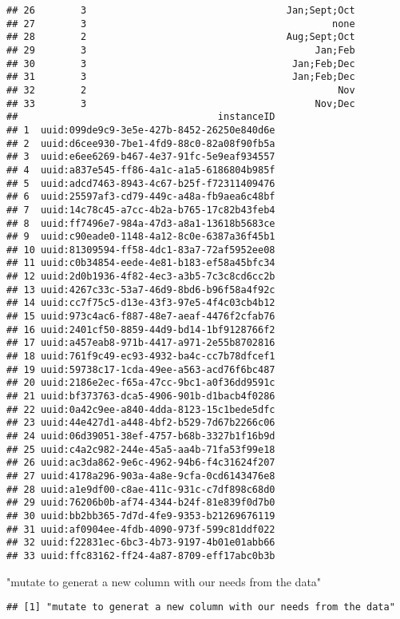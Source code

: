 \documentclass[
]{article}
\newenvironment{Shaded}{\begin{snugshade}}{\end{snugshade}}
\newcommand{\StringTok}[1]{\textcolor[rgb]{0.31,0.60,0.02}{#1}}
\begin{document}
\begin{verbatim}
## 26        3                                   Jan;Sept;Oct
## 27        3                                           none
## 28        2                                   Aug;Sept;Oct
## 29        3                                        Jan;Feb
## 30        3                                    Jan;Feb;Dec
## 31        3                                    Jan;Feb;Dec
## 32        2                                            Nov
## 33        3                                        Nov;Dec
##                                   instanceID
## 1  uuid:099de9c9-3e5e-427b-8452-26250e840d6e
## 2  uuid:d6cee930-7be1-4fd9-88c0-82a08f90fb5a
## 3  uuid:e6ee6269-b467-4e37-91fc-5e9eaf934557
## 4  uuid:a837e545-ff86-4a1c-a1a5-6186804b985f
## 5  uuid:adcd7463-8943-4c67-b25f-f72311409476
## 6  uuid:25597af3-cd79-449c-a48a-fb9aea6c48bf
## 7  uuid:14c78c45-a7cc-4b2a-b765-17c82b43feb4
## 8  uuid:ff7496e7-984a-47d3-a8a1-13618b5683ce
## 9  uuid:c90eade0-1148-4a12-8c0e-6387a36f45b1
## 10 uuid:81309594-ff58-4dc1-83a7-72af5952ee08
## 11 uuid:c0b34854-eede-4e81-b183-ef58a45bfc34
## 12 uuid:2d0b1936-4f82-4ec3-a3b5-7c3c8cd6cc2b
## 13 uuid:4267c33c-53a7-46d9-8bd6-b96f58a4f92c
## 14 uuid:cc7f75c5-d13e-43f3-97e5-4f4c03cb4b12
## 15 uuid:973c4ac6-f887-48e7-aeaf-4476f2cfab76
## 16 uuid:2401cf50-8859-44d9-bd14-1bf9128766f2
## 17 uuid:a457eab8-971b-4417-a971-2e55b8702816
## 18 uuid:761f9c49-ec93-4932-ba4c-cc7b78dfcef1
## 19 uuid:59738c17-1cda-49ee-a563-acd76f6bc487
## 20 uuid:2186e2ec-f65a-47cc-9bc1-a0f36dd9591c
## 21 uuid:bf373763-dca5-4906-901b-d1bacb4f0286
## 22 uuid:0a42c9ee-a840-4dda-8123-15c1bede5dfc
## 23 uuid:44e427d1-a448-4bf2-b529-7d67b2266c06
## 24 uuid:06d39051-38ef-4757-b68b-3327b1f16b9d
## 25 uuid:c4a2c982-244e-45a5-aa4b-71fa53f99e18
## 26 uuid:ac3da862-9e6c-4962-94b6-f4c31624f207
## 27 uuid:4178a296-903a-4a8e-9cfa-0cd6143476e8
## 28 uuid:a1e9df00-c8ae-411c-931c-c7df898c68d0
## 29 uuid:76206b0b-af74-4344-b24f-81e839f0d7b0
## 30 uuid:bb2bb365-7d7d-4fe9-9353-b21269676119
## 31 uuid:af0904ee-4fdb-4090-973f-599c81ddf022
## 32 uuid:f22831ec-6bc3-4b73-9197-4b01e01abb66
## 33 uuid:ffc83162-ff24-4a87-8709-eff17abc0b3b
\end{verbatim}

\begin{Shaded}
\begin{Highlighting}[]
\StringTok{"mutate to generat a new column with our needs from the data"}
\end{Highlighting}
\end{Shaded}

\begin{verbatim}
## [1] "mutate to generat a new column with our needs from the data"
\end{verbatim}
\end{document}
